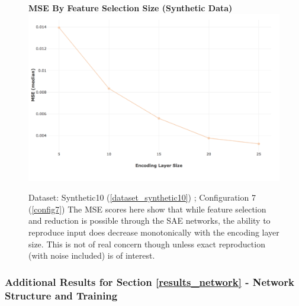 \documentclass[a4paper,11pt,oneside]{article}
\theoremstyle{plain}
\theoremstyle{definition}
\begin{document}
	\begin{figure}[H]
		\centering 
		\textbf{MSE By Feature Selection Size (Synthetic Data)}
		\includegraphics[scale=0.3]{images/results/feature_selection/synth_sae_mse.png} 
		\caption[MSE By Feature Selection Size (Synthetic Data)]{Dataset: Synthetic10 (\ref{dataset_synthetic10}) ; Configuration 7 (\ref{config7})
			\newline The MSE scores here show that while feature selection and reduction is possible through the SAE networks, the ability to reproduce input does decrease monotonically with the encoding layer size. This is not of real concern though unless exact reproduction (with noise included) is of interest.}
		\label{figure-synth_sae_mse}
	\end{figure}
	
	\subsubsection{Additional Results for Section \ref{results_network} - Network Structure and Training }\label{results_network_appendix}
	
\end{document}
